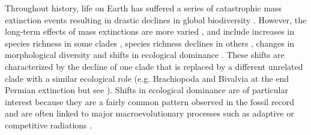 \documentclass[12pt,letterpaper]{article}
\begin{document}
Throughout history, life on Earth has suffered a series of catastrophic mass extinction events resulting in drastic declines in global biodiversity \citep[e.g.][]{RaupPT,BentonPT,rennetime2013,Brusatte2015}. %
However, the long-term effects of mass extinctions are more varied \citep{Erwin1998344}, and include increases in species richness in some clades \citep{friedmanexplosive2010}, species richness declines in others \citep{Benton85}, changes in morphological diversity \cite{Ciampaglio2001,Ciampaglio200,kornextinction2013} and shifts in ecological dominance \citep[e.g.][]{Brusatte12092008,toljagictriassic-jurassic2013,bensonfaunal2014}.
These shifts are characterized by the decline of one clade that is replaced by a different unrelated clade with a similar ecological role (e.g. Brachiopoda and Bivalvia at the end Permian extinction \citealt{Sepkiski1981,CLAPHAM01102006} but see \citealt{Payne22052014}). 
Shifts in ecological dominance are of particular interest because they are a fairly common pattern observed in the fossil record \citep[e.g.][]{D'Hondt01011996,Coxall01042006,thorneresetting2011,bensonfaunal2014} 
and are often linked to major macroevolutionary processes such as adaptive or competitive radiations \citep{Losos2010,Brusatte12092008}.
\end{document}
